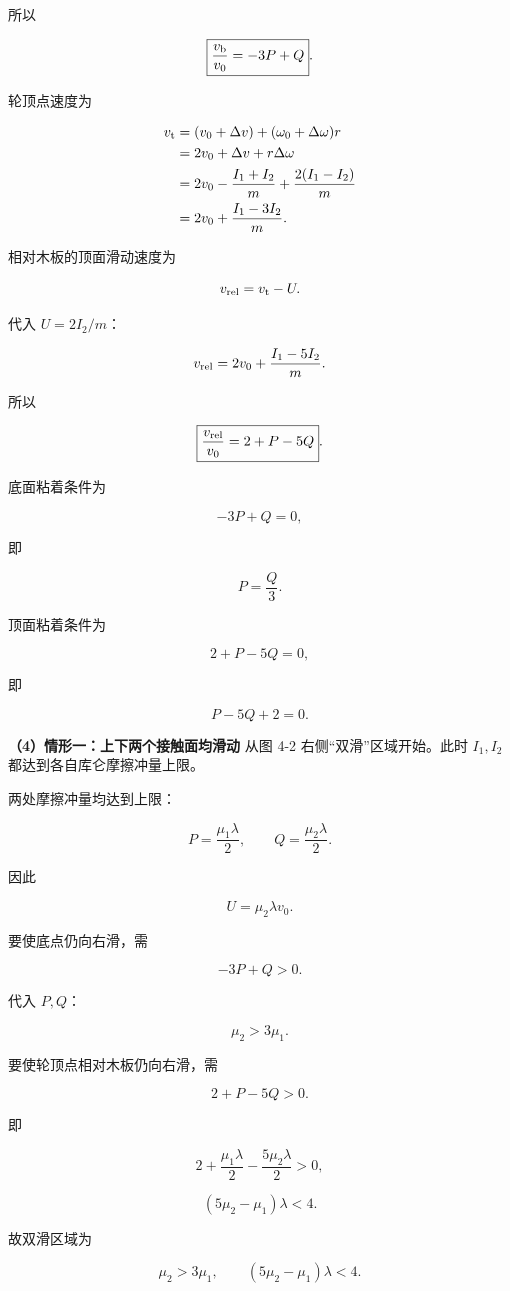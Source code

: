 \documentclass[12pt,a4paper,UTF8]{ctexart}
\begin{document}
所以

\[\boxed{\frac{v_{\rm b}}{v_0}=-3P+Q}.\]

轮顶点速度为

\[\begin{aligned}
v_{\rm t}
&=(v_0+\Delta v)+(\omega_0+\Delta\omega)r\\
&=2v_0+\Delta v+r\Delta\omega\\
&=2v_0-\frac{I_1+I_2}{m}+\frac{2(I_1-I_2)}m\\
&=2v_0+\frac{I_1-3I_2}{m}.
\end{aligned}\]

相对木板的顶面滑动速度为

\[v_{\rm rel}=v_{\rm t}-U.\]

代入 \(U=2I_2/m\)：

\[v_{\rm rel}=2v_0+\frac{I_1-5I_2}{m}.\]

所以

\[\boxed{\frac{v_{\rm rel}}{v_0}=2+P-5Q}.\]

底面粘着条件为

\[-3P+Q=0,\]

即

\[\boxed{P=\frac Q3}.\]

顶面粘着条件为

\[2+P-5Q=0,\]

即

\[\boxed{P-5Q+2=0}.\]

\textbf{（4）情形一：上下两个接触面均滑动} 从图 4-2
右侧``双滑''区域开始。此时 \(I_1,I_2\) 都达到各自库仑摩擦冲量上限。

两处摩擦冲量均达到上限：

\[P=\frac{\mu_1\lambda}{2},
\qquad
Q=\frac{\mu_2\lambda}{2}.\]

因此

\[\boxed{U=\mu_2\lambda v_0}.\]

要使底点仍向右滑，需

\[-3P+Q>0.\]

代入 \(P,Q\)：

\[\mu_2>3\mu_1.\]

要使轮顶点相对木板仍向右滑，需

\[2+P-5Q>0.\]

即

\[2+\frac{\mu_1\lambda}{2}-\frac{5\mu_2\lambda}{2}>0,\]

\[\boxed{(5\mu_2-\mu_1)\lambda<4}.\]

故双滑区域为

\[\boxed{
\mu_2>3\mu_1,
\qquad
(5\mu_2-\mu_1)\lambda<4
}.\]
\end{document}
